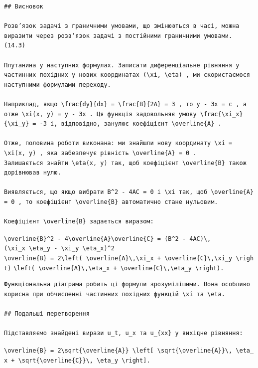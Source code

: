 \documentclass[
  ukrainian,
]{article}
\begin{document}
\begin{verbatim}
## Висновок

Розв’язок задачі з граничними умовами, що змінюються в часі, можна виразити через розв’язок задачі з постійними граничними умовами.
(14.3)

Плутанина у наступних формулах. Записати диференціальне рівняння у частинних похідних у нових координатах (\xi, \eta) , ми скористаємося наступними формулами переходу.

Наприклад, якщо \frac{dy}{dx} = \frac{B}{2A} = 3 , то y - 3x = c , а отже \xi(x, y) = y - 3x . Ця функція задовольняє умову \frac{\xi_x}{\xi_y} = -3 і, відповідно, занулює коефіцієнт \overline{A} .

Отже, половина роботи виконана: ми знайшли нову координату \xi = \xi(x, y) , яка забезпечує рівність \overline{A} = 0 .  
Залишається знайти \eta(x, y) так, щоб коефіцієнт \overline{B} також дорівнював нулю.

Виявляється, що якщо вибрати B^2 - 4AC = 0 і \xi так, щоб \overline{A} = 0 , то коефіцієнт \overline{B} автоматично стане нульовим.

Коефіцієнт \overline{B} задається виразом:
\end{verbatim}

\texttt{\textbackslash{}overline\{B\}\^{}2\ -\ 4\textbackslash{}overline\{A\}\textbackslash{}overline\{C\}\ =\ (B\^{}2\ -\ 4AC)\textbackslash{},(\textbackslash{}xi\_x\ \textbackslash{}eta\_y\ -\ \textbackslash{}xi\_y\ \textbackslash{}eta\_x)\^{}2}
\texttt{\textbackslash{}overline\{B\}\ =\ 2\textbackslash{}left(\ \textbackslash{}overline\{A\}\textbackslash{},\textbackslash{}xi\_x\ +\ \textbackslash{}overline\{C\}\textbackslash{},\textbackslash{}xi\_y\ \textbackslash{}right)}
\texttt{\textbackslash{}left(\ \textbackslash{}overline\{A\}\textbackslash{},\textbackslash{}eta\_x\ +\ \textbackslash{}overline\{C\}\textbackslash{},\textbackslash{}eta\_y\ \textbackslash{}right).}

\begin{verbatim}
Функціональна діаграма робить ці формули зрозумілішими. Вона особливо корисна при обчисленні частинних похідних функцій \xi та \eta.

## Подальші перетворення

Підставляємо знайдені вирази u_t, u_x та u_{xx} у вихідне рівняння:
\end{verbatim}

\texttt{\textbackslash{}overline\{B\}\ =\ 2\textbackslash{}sqrt\{\textbackslash{}overline\{A\}\}\ \textbackslash{}left{[}\ \textbackslash{}sqrt\{\textbackslash{}overline\{A\}\}\textbackslash{},\ \textbackslash{}eta\_x\ +\ \textbackslash{}sqrt\{\textbackslash{}overline\{C\}\}\textbackslash{},\ \textbackslash{}eta\_y\ \textbackslash{}right{]}.}
\end{document}
